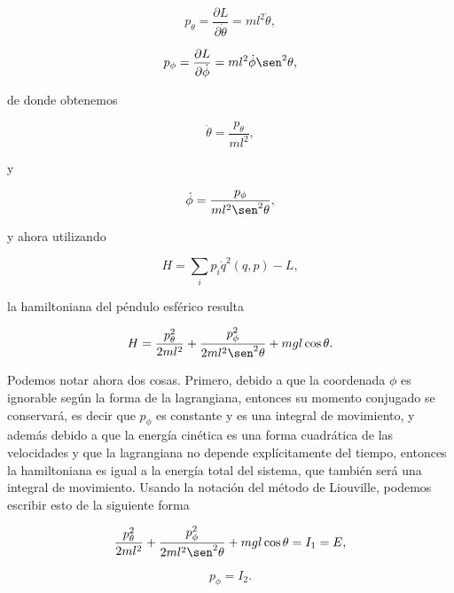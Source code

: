 \documentclass[a4paper,10pt]{article}
\numberwithin{equation}{section}
\begin{document}
\begin{equation}
 p_\theta = \frac{\partial L}{\partial \dot{\theta}} = ml^2\dot{\theta},
\end{equation}

\begin{equation}
 p_\phi = \frac{\partial L}{\partial \dot{\phi}} = ml^2\dot{\phi}\sen^2{\theta},
\end{equation}

de donde obtenemos 

\begin{equation}
 \dot{\theta} = \frac{p_\theta}{ml^2},
\end{equation}

y

\begin{equation}
 \dot{\phi} = \frac{p_\phi}{ml^2\sen^2{\theta}},
\end{equation}

y ahora utilizando 

\begin{equation}
 H = \sum_i p_i \dot{q}^2(q,p) - L, 
\end{equation}

la hamiltoniana del péndulo esférico resulta

\begin{equation}
 H = \frac{p_\theta^2}{2ml^2} + \frac{p_\phi^2}{2ml^2\sen^2{\theta}} 
 + mgl\cos{\theta}.
 \label{eq:hamiltonianaPendEsf}
\end{equation}

Podemos notar ahora dos cosas. Primero, debido a que la coordenada $\phi$ es 
ignorable según la forma de la lagrangiana, entonces su momento conjugado se 
conservará, es decir que $p_\phi$ es constante y es una integral de movimiento,
y además debido a que la energía  cinética es una forma cuadrática de las 
velocidades y que la lagrangiana no depende explícitamente del tiempo,
entonces la hamiltoniana es igual a la energía total  del sistema, que también
será una integral de movimiento. Usando la notación del método de Liouville, 
podemos escribir esto de la siguiente forma 

\begin{equation}
  \frac{p_\theta^2}{2ml^2} + \frac{p_\phi^2}{2ml^2\sen^2{\theta}} 
 + mgl\cos{\theta} = I_1 = E,
 \label{eq:energiaPendEsf}
\end{equation}

\begin{equation}
 p_\phi = I_2.
 \label{eq:pphiPendEsf}
\end{equation}
\end{document}
